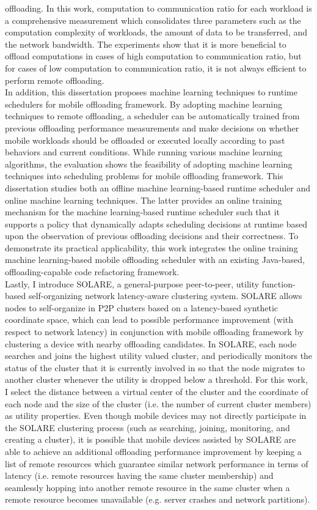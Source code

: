 offloading.
%
In this work, computation to communication ratio for each workload is a
comprehensive measurement which consolidates three parameters such as the
computation complexity of workloads, the amount of data to be
transferred, and the network bandwidth.
%
The experiments show that it is more beneficial to offload computations
in cases of high computation to communication ratio, but for cases of
low computation to communication ratio, it is not always efficient to
perform remote offloading.\\
%
In addition, this dissertation proposes machine learning
techniques to runtime schedulers for mobile offloading framework.
%
By adopting machine learning techniques to remote offloading, a
scheduler can be automatically trained from previous offloading
performance measurements and make decisions on whether mobile workloads
should be offloaded or executed locally according to past behaviors and
current conditions.
%
While running various machine learning algorithms, the evaluation shows the
feasibility of adopting machine learning techniques into scheduling
problems for mobile offloading framework.
%
This dissertation studies both an offline machine
learning-based runtime scheduler and online machine learning techniques.
%
The latter provides an online training mechanism for the machine
learning-based runtime scheduler such that it supports a policy that
dynamically adapts scheduling decisions at runtime based upon the
observation of previous offloading decisions and their correctness.
%
To demonstrate its practical applicability, this work integrates the
online training machine learning-based mobile offloading scheduler with
an existing Java-based, offloading-capable code refactoring framework.\\ 
%
Lastly, I introduce SOLARE, a general-purpose peer-to-peer, utility
function-based self-organizing network latency-aware clustering system.
%
SOLARE allows nodes to self-organize in P2P clusters based on a
latency-based synthetic coordinate space, which can lead to possible
performance improvement (with respect to network latency) in conjunction
with mobile offloading framework by clustering a device with nearby
offloading candidates. 
%
In SOLARE, each node searches and joins the highest utility valued
cluster, and periodically monitors the status of the cluster that it is
currently involved in so that the node migrates to another cluster
whenever the utility is dropped below a threshold.
%
For this work, I select the distance between a virtual center of the
cluster and the coordinate of each node and the size of the cluster
(i.e. the number of current cluster members) as utility properties.
%
Even though mobile devices may not directly participate in the SOLARE
clustering process (such as searching, joining, monitoring, and creating
a cluster), it is possible that mobile devices assisted by SOLARE
are able to achieve an additional offloading performance improvement by
keeping a list of remote resources which guarantee similar network
performance in terms of latency (i.e. remote resources
having the same cluster membership) and seamlessly hopping into another
remote resource in the same cluster when a remote resource becomes
unavailable (e.g. server crashes and network partitions).
%

